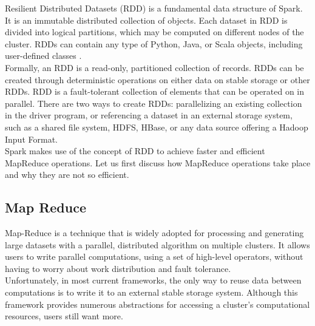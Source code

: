 Resilient Distributed Datasets (RDD) is a fundamental data structure of Spark. It is an immutable distributed collection of objects. Each dataset in RDD is divided into logical partitions, which may be computed on different nodes of the cluster. RDDs can contain any type of Python, Java, or Scala objects, including user-defined classes \cite{cite1}.\\

Formally, an RDD is a read-only, partitioned collection of records. RDDs can be created through deterministic operations on either data on stable storage or other RDDs. RDD is a fault-tolerant collection of elements that can be operated on in parallel. There are two ways to create RDDs: parallelizing an existing collection in the driver program, or referencing a dataset in an external storage system, such as a shared file system, HDFS, HBase, or any data source offering a Hadoop Input Format.\\

Spark makes use of the concept of RDD to achieve faster and efficient MapReduce operations. Let us first discuss how MapReduce operations take place and why they are not so efficient.

\subsection{Map Reduce} 

Map-Reduce is a technique that is widely adopted for processing and generating large datasets with a parallel, distributed algorithm on multiple clusters. It allows users to write parallel computations, using a set of high-level operators, without having to worry about work distribution and fault tolerance.\\

Unfortunately, in most current frameworks, the only way to reuse data between computations is to write it to an external stable storage system. Although this framework provides numerous abstractions for accessing a cluster's computational resources, users still want more.\\

